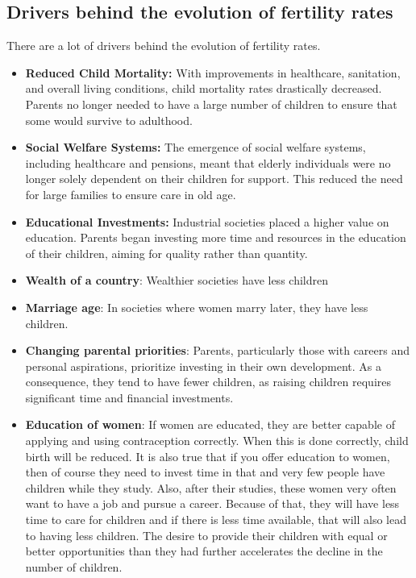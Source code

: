 \documentclass[../summary.tex]{subfiles}
\begin{document}
	\subsection{Drivers behind the evolution of fertility rates}
	
	There are a lot of drivers behind the evolution of fertility rates.
	
	\begin{itemize}
		\item \textbf{Reduced Child Mortality:} With improvements in healthcare, sanitation, and overall living conditions, child mortality rates drastically decreased. Parents no longer needed to have a large number of children to ensure that some would survive to adulthood.
		\item \textbf{Social Welfare Systems:} The emergence of social welfare systems, including healthcare and pensions, meant that elderly individuals were no longer solely dependent on their children for support. This reduced the need for large families to ensure care in old age.
		\item \textbf{Educational Investments:} Industrial societies placed a higher value on education. Parents began investing more time and resources in the education of their children, aiming for quality rather than quantity.
		\item \textbf{Wealth of a country}: Wealthier societies have less children
		\item \textbf{Marriage age}: In societies where women marry later, they have less children.
		\item \textbf{Changing parental priorities}: Parents, particularly those with careers and personal aspirations, prioritize investing in their own development. As a consequence, they tend to have fewer children, as raising children requires significant time and financial investments.
		\item \textbf{Education of women}: If women are educated, they are better capable of applying and using contraception correctly. When this is done correctly, child birth will be reduced. It is also true that if you offer education to women, then of course they need to invest time in that and very few people have children while they study. Also, after their studies, these women very often want to have a job and pursue a career. Because of that, they will have less time to care for children and if there is less time available, that will also lead to having less children. The desire to provide their children with equal or better opportunities than they had further accelerates the decline in the number of children.
	\end{itemize}
	
\end{document}
